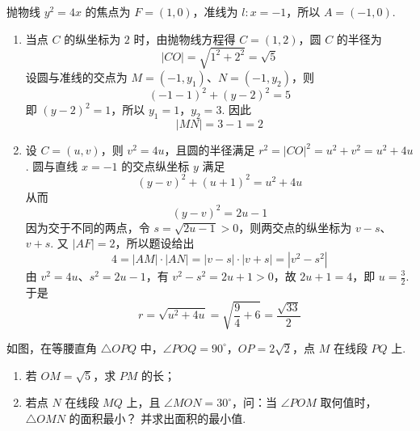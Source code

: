 \begin{solution}
抛物线 \(y^2=4x\) 的焦点为 \(F=(1,0)\)，准线为 \(l:x=-1\)，所以 \(A=(-1,0)\).

\begin{enumerate}
\item 当点 \(C\) 的纵坐标为 \(2\) 时，由抛物线方程得 \(C=(1,2)\)，圆 \(C\) 的半径为
\[
|CO|=\sqrt{1^2+2^2}=\sqrt5
\]
设圆与准线的交点为 \(M=(-1,y_1)\)、\(N=(-1,y_2)\)，则
\[
(-1-1)^2+(y-2)^2=5
\]
即 \((y-2)^2=1\)，所以 \(y_1=1\)，\(y_2=3\). 因此
\[
|MN|=3-1=2
\]

\item 设 \(C=(u,v)\)，则 \(v^2=4u\)，且圆的半径满足 \(r^2=|CO|^2=u^2+v^2=u^2+4u\). 圆与直线 \(x=-1\) 的交点纵坐标 \(y\) 满足
\[
(y-v)^2+(u+1)^2=u^2+4u
\]
从而
\[
(y-v)^2=2u-1
\]
因为交于不同的两点，令 \(s=\sqrt{2u-1}>0\)，则两交点的纵坐标为 \(v-s\)、\(v+s\). 又 \(|AF|=2\)，所以题设给出
\[
4=|AM|\cdot|AN|=|v-s|\cdot|v+s|=|v^2-s^2|
\]
由 \(v^2=4u\)、\(s^2=2u-1\)，有 \(v^2-s^2=2u+1>0\)，故 \(2u+1=4\)，即 \(u=\frac32\). 于是
\[
r=\sqrt{u^2+4u}=\sqrt{\frac94+6}=\frac{\sqrt{33}}2
\]
\end{enumerate}
\end{solution}

\begin{problem}
如图，在等腰直角 \(\triangle OPQ\) 中，\(\angle POQ = 90^{\circ}\)，\(OP = 2\sqrt{2}\)，点 \(M\) 在线段 \(PQ\) 上.
\begin{enumerate}
\item 若 \(OM = \sqrt{5}\)，求 \(PM\) 的长；
\item 若点 \(N\) 在线段 \(MQ\) 上，且 \(\angle MON = 30^{\circ}\)，问：当 \(\angle POM\) 取何值时，\(\triangle OMN\) 的面积最小？ 并求出面积的最小值.
\end{enumerate}

\end{problem}

